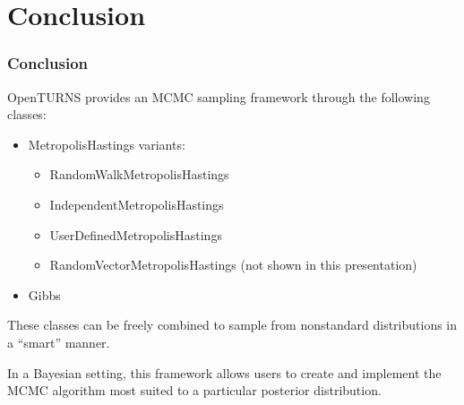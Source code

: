 \documentclass{beamer}
\begin{document}
\section{Conclusion}
\begin{frame}
    \frametitle{Conclusion}
    OpenTURNS provides an MCMC sampling framework through the following classes:
    \begin{itemize}
        \item MetropolisHastings variants:
        \begin{itemize}
            \item RandomWalkMetropolisHastings
            \item IndependentMetropolisHastings
            \item UserDefinedMetropolisHastings
            \item RandomVectorMetropolisHastings (not shown in this presentation)
        \end{itemize}
        \item Gibbs
    \end{itemize}
    \medskip
    These classes can be freely combined to sample from nonstandard distributions
    in a ``smart'' manner. \medskip

    In a Bayesian setting, this framework allows users to create and implement
    the MCMC algorithm most suited to a particular posterior distribution.
\end{frame}
    
\end{document}
